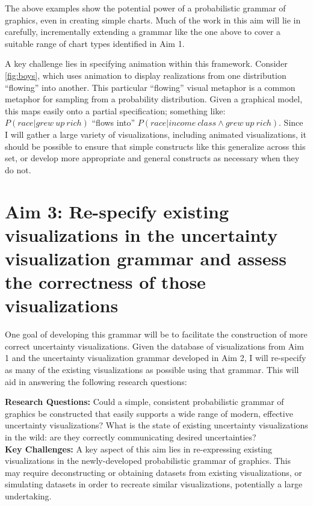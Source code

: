 \documentclass[11pt]{article}
\begin{document}
The above examples show the potential power of a probabilistic grammar of graphics, even in creating simple charts. Much of the work in this aim will lie in carefully, incrementally extending a grammar like the one above to cover a suitable range of chart types identified in Aim 1. 

A key challenge lies in specifying animation within this framework. Consider \ref{fig:boys}, which uses animation to display realizations from one distribution ``flowing'' into another. This particular ``flowing'' visual metaphor is a common metaphor for sampling from a probability distribution. Given a graphical model, this maps easily onto a partial specification; something like: $P(race|grew~up~rich)$ ``flows into'' $P(race|income~class \wedge grew~up~rich)$. Since I will gather a large variety of visualizations, including animated visualizations, it should be possible to ensure that simple constructs like this generalize across this set, or develop more appropriate and general constructs as necessary when they do not.




\section{Aim 3: Re-specify existing visualizations in the uncertainty visualization grammar and assess the correctness of those visualizations}

\noindent One goal of developing this grammar will be to facilitate the construction of more correct uncertainty visualizations. Given the database of visualizations from Aim 1 and the uncertainty visualization grammar developed in Aim 2, I will re-specify as many of the existing visualizations as possible using that grammar. This will aid in answering the following research questions:

\noindent\hrulefill
\vspace{-0.5em}

\noindent\textbf{Research Questions:}
Could a simple, consistent probabilistic grammar of graphics be constructed that easily supports a wide range of modern, effective uncertainty visualizations? What is the state of existing uncertainty visualizations in the wild: are they correctly communicating desired uncertainties?
\\
\noindent\textbf{Key Challenges:}
A key aspect of this aim lies in re-expressing existing visualizations in the newly-developed probabilistic grammar of graphics. This may require deconstructing or obtaining datasets from existing visualizations, or simulating datasets in order to recreate similar visualizations, potentially a large undertaking.
\end{document}
